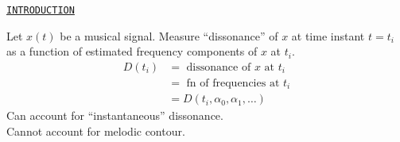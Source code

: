 \documentclass{slides}
\begin{document}

\begin{slide}%
\begin{center}{\tt \underline{INTRODUCTION}}\end{center}
Let $x(t)$ be a musical signal.  Measure ``dissonance'' of $x$ at time 
instant $t = t_i$ as a function of estimated frequency components of $x$ at
$t_i$.  
\begin{align*}
D(t_i) &= \text{ dissonance of } x \text{ at } t_i\\
&= \text{ fn of frequencies at } t_i\\
&= D(t_i, \alpha_0, \alpha_1,\ldots)
\end{align*}
Can account for ``instantaneous'' dissonance.\\
Cannot account for melodic contour.
\end{slide}
\end{document}
